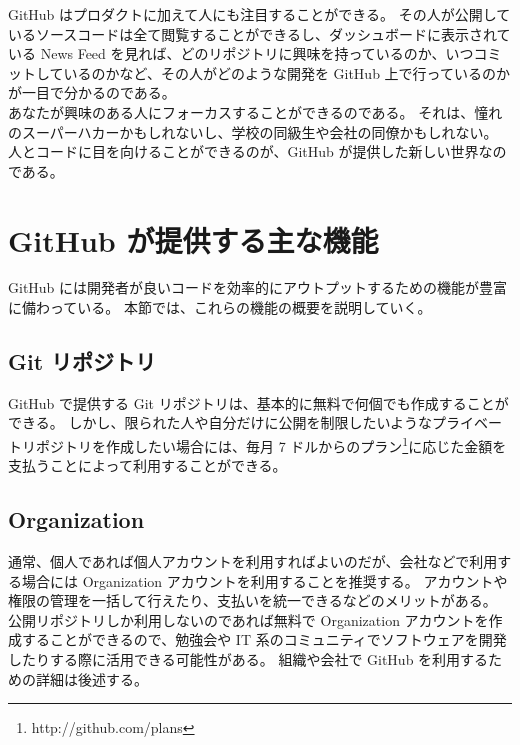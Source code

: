 GitHub はプロダクトに加えて人にも注目することができる。
その人が公開しているソースコードは全て閲覧することができるし、ダッシュボードに表示されている News Feed を見れば、どのリポジトリに興味を持っているのか、いつコミットしているのかなど、その人がどのような開発を GitHub 上で行っているのかが一目で分かるのである。\\

あなたが興味のある人にフォーカスすることができるのである。
それは、憧れのスーパーハカーかもしれないし、学校の同級生や会社の同僚かもしれない。\\

人とコードに目を向けることができるのが、GitHub が提供した新しい世界なのである。
\section{GitHub が提供する主な機能}
GitHub には開発者が良いコードを効率的にアウトプットするための機能が豊富に備わっている。
本節では、これらの機能の概要を説明していく。
\subsection{Git リポジトリ}
GitHub で提供する Git リポジトリは、基本的に無料で何個でも作成することができる。
しかし、限られた人や自分だけに公開を制限したいようなプライベートリポジトリを作成したい場合には、毎月 7 ドルからのプラン\footnote{http://github.com/plans}に応じた金額を支払うことによって利用することができる。
\subsection{Organization}
通常、個人であれば個人アカウントを利用すればよいのだが、会社などで利用する場合には Organization アカウントを利用することを推奨する。
アカウントや権限の管理を一括して行えたり、支払いを統一できるなどのメリットがある。\\

公開リポジトリしか利用しないのであれば無料で Organization アカウントを作成することができるので、勉強会や IT 系のコミュニティでソフトウェアを開発したりする際に活用できる可能性がある。
組織や会社で GitHub を利用するための詳細は後述する。

